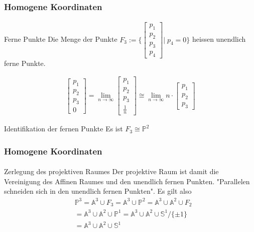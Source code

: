 \documentclass{beamer}
\begin{document}
\begin{frame}
    \frametitle{Homogene Koordinaten}
\framesubtitle{}
\begin{block}{Ferne Punkte}
Die Menge der Punkte $F_3 := \Biggl \{\begin{bmatrix} p_1 \\ p_2 \\ p_3  \\ p_4 \end{bmatrix}\Bigg | \; p_{4} = 0 \Biggr \} $ heissen unendlich ferne Punkte.

\begin{align*}
 \begin{bmatrix} p_1 \\ p_2 \\ p_3  \\ 0 \end{bmatrix}  =\lim_{n \to \infty} \begin{bmatrix} p_1 \\ p_2 \\ p_3  \\ \frac{1}{n} \end{bmatrix}  \cong  \lim_{n \to \infty} n \cdot  \begin{bmatrix} p_1 \\ p_2 \\ p_3 \end{bmatrix} 
\end{align*}
\end{block}

\begin{block}{Identifikation der fernen Punkte}
Es ist $F_3 \cong \mathbb{P}^2$
\end{block}
\end{frame}


\begin{frame}
    \frametitle{Homogene Koordinaten}
\framesubtitle{}
\begin{block}{Zerlegung des projektiven Raumes}
Der projektive Raum ist damit die Vereinigung des Affinen Raumes und den unendlich fernen Punkten. "Parallelen schneiden sich in den unendlich fernen Punkten".
Es gilt also 
\begin{align*}
& \mathbb{P}^3 = \mathbb{A}^3 \cup F_3 = \mathbb{A}^3  \cup \mathbb{P}^2 =  \mathbb{A}^3  \cup \mathbb{A}^2 \cup F_2  \\  
& =\mathbb{A}^3  \cup \mathbb{A}^2 \cup  \mathbb{P}^1 =   \mathbb{A}^3  \cup \mathbb{A}^2 \cup  \mathbb{S}^1/ \{ \pm  1\} \\
& =  \mathbb{A}^3  \cup \mathbb{A}^2 \cup  \mathbb{S}^1
\end{align*}
\end{block}
\end{frame}
\end{document}
